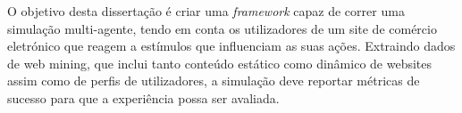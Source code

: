 O objetivo desta dissertação é criar uma \textit{framework} capaz de correr uma 
simulação multi-agente, tendo em conta os utilizadores de um site de comércio 
eletrónico que reagem a estímulos que influenciam as suas ações. Extraindo 
dados de web mining, que inclui tanto conteúdo estático como dinâmico de 
websites assim como de perfis de utilizadores, a simulação deve reportar 
métricas de sucesso para que a experiência possa ser avaliada.
